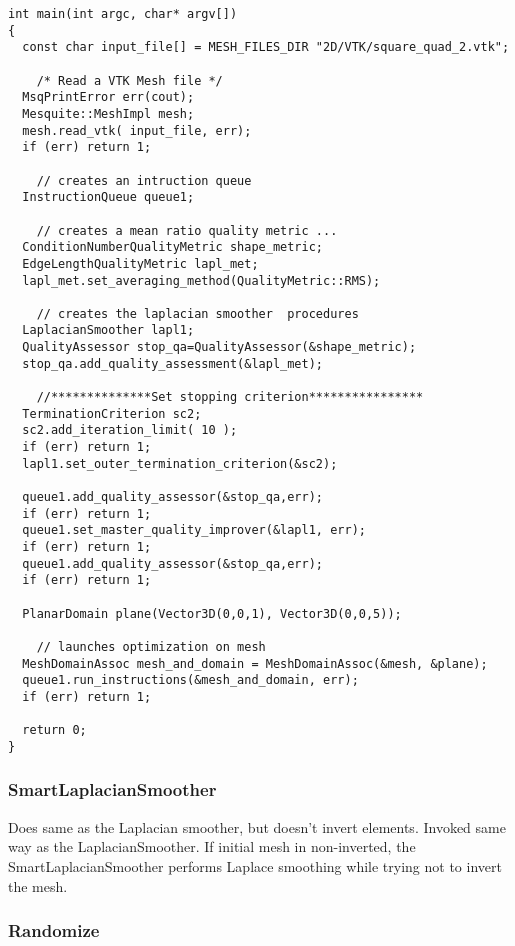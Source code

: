 \begin{lstlisting}[frame=single]
int main(int argc, char* argv[])
{
  const char input_file[] = MESH_FILES_DIR "2D/VTK/square_quad_2.vtk";

    /* Read a VTK Mesh file */
  MsqPrintError err(cout);
  Mesquite::MeshImpl mesh;
  mesh.read_vtk( input_file, err);
  if (err) return 1;
  
    // creates an intruction queue
  InstructionQueue queue1;
  
    // creates a mean ratio quality metric ...
  ConditionNumberQualityMetric shape_metric;
  EdgeLengthQualityMetric lapl_met;
  lapl_met.set_averaging_method(QualityMetric::RMS);
 
    // creates the laplacian smoother  procedures
  LaplacianSmoother lapl1;
  QualityAssessor stop_qa=QualityAssessor(&shape_metric);
  stop_qa.add_quality_assessment(&lapl_met);
  
    //**************Set stopping criterion****************
  TerminationCriterion sc2;
  sc2.add_iteration_limit( 10 );
  if (err) return 1;
  lapl1.set_outer_termination_criterion(&sc2);
  
  queue1.add_quality_assessor(&stop_qa,err); 
  if (err) return 1;
  queue1.set_master_quality_improver(&lapl1, err); 
  if (err) return 1;
  queue1.add_quality_assessor(&stop_qa,err); 
  if (err) return 1;
 
  PlanarDomain plane(Vector3D(0,0,1), Vector3D(0,0,5));
  
    // launches optimization on mesh
  MeshDomainAssoc mesh_and_domain = MeshDomainAssoc(&mesh, &plane);
  queue1.run_instructions(&mesh_and_domain, err); 
  if (err) return 1;

  return 0;
}
\end{lstlisting}

\subsubsection{SmartLaplacianSmoother}

Does same as the Laplacian smoother, but doesn't invert elements.  Invoked same way as the LaplacianSmoother.  If initial mesh in non-inverted, the SmartLaplacianSmoother performs Laplace smoothing while trying not to invert the mesh.

\subsubsection{Randomize}


